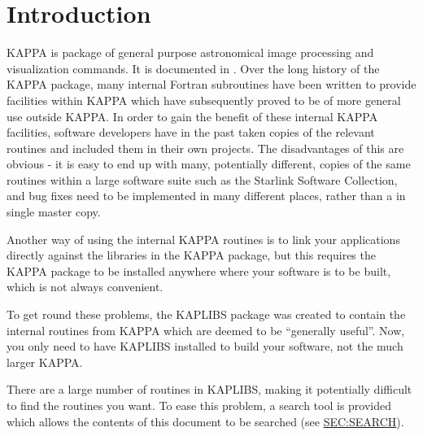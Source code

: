\stardocabstract
 \newpage
 \begin{latexonly}
   \setlength{\parskip}{0mm}
   \latexonlytoc
   \setlength{\parskip}{\medskipamount}
   \markright{\stardocname}
 \end{latexonly}
\cleardoublepage
\renewcommand{\thepage}{\arabic{page}}
\setcounter{page}{1}

\section {Introduction}

KAPPA is package of general purpose astronomical image processing and
visualization commands. It is documented in . Over
the long history of the KAPPA package, many internal Fortran subroutines
have been written to provide facilities within KAPPA which have
subsequently proved to be of more general use outside KAPPA. In order to
gain the benefit of these internal KAPPA facilities, software developers
have in the past taken copies of the relevant routines and included them
in their own projects. The disadvantages of this are obvious - it is easy
to end up with many, potentially different, copies of the same routines
within a large software suite such as the Starlink Software Collection,
and bug fixes need to be implemented in many different places, rather
than a in single master copy.

Another way of using the internal KAPPA routines is to link your
applications directly against the libraries in the KAPPA package, but
this requires the KAPPA package to be installed anywhere where your
software is to be built, which is not always convenient.

To get round these problems, the KAPLIBS package was created to
contain the internal routines from KAPPA which are deemed to be
``generally useful''. Now, you only need to have KAPLIBS installed to
build your software, not the much larger KAPPA.

There are a large number of routines in KAPLIBS, making it potentially
difficult to find the routines you want. To ease this problem, a search
tool is provided which allows the contents of this document to be
searched (see \hyperref{here}{section }{}{SEC:SEARCH}).

